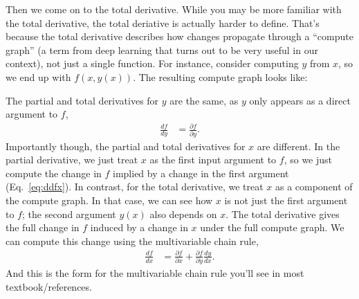 \documentclass{article}
\newcommand{\dd}[2][]{\frac{\partial #1}{\partial #2}}
\newcommand{\dt}[2][]{\frac{d #1}{d #2}}
\begin{document}
Then we come on to the total derivative.
While you may be more familiar with the total derivative, the total deriative is actually harder to define.
That's because the total derivative describes how changes propagate through a ``compute graph'' (a term from deep learning that turns out to be very useful in our context), not just a single function.
For instance, consider computing $y$ from $x$, so we end up with $f(x, y(x))$.
The resulting compute graph looks like:
\begin{center}
\end{center}
The partial and total derivatives for $y$ are the same, as $y$ only appears as a direct argument to $f$,
\begin{align}
  \dt[f]{y} &= \dd[f]{y}.
\end{align}
Importantly though, the partial and total derivatives for $x$ are different.
In the partial derivative, we just treat $x$ as the first input argument to $f$, so we just compute the change in $f$ implied by a change in the first argument (Eq.~\ref{eq:ddfx}).
In contrast, for the total derivative, we treat $x$ as a component of the compute graph.
In that case, we can see how $x$ is not just the first argument to $f$; the second argument $y(x)$ also depends on $x$.
The total derivative gives the full change in $f$ induced by a change in $x$ under the full compute graph.
We can compute this change using the multivariable chain rule,
\begin{align}
  \dt[f]{x} &= \dd[f]{x} + \dd[f]{y} \dt[y]{x}.
\end{align}
And this is the form for the multivariable chain rule you'll see in most textbook/references.
\end{document}
